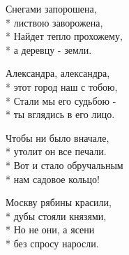 \medskip

\begin{minipage}{\linewidth}
Снегами запорошена,\\*
листвою заворожена,\\*
Найдет тепло прохожему,\\*
а деревцу - земли.\\
\end{minipage}\par\medskip\nobreak

\medskip

\begin{minipage}{\linewidth}
\hspace*{1.5em}Александра, александра,\\*
\hspace*{1.5em}этот город наш с тобою,\\*
\hspace*{1.5em}Стали мы его судьбою -\\*
\hspace*{1.5em}ты вглядись в его лицо.\\
\end{minipage}\par\medskip\nobreak

\medskip

\begin{minipage}{\linewidth}
\hspace*{1.5em}Чтобы ни было вначале,\\*
\hspace*{1.5em}утолит он все печали.\\*
\hspace*{1.5em}Вот и стало обручальным\\*
\hspace*{1.5em}нам садовое кольцо!\\
\end{minipage}\par\medskip\nobreak

\medskip

\begin{minipage}{\linewidth}
Москву рябины красили,\\*
дубы стояли князями,\\*
Но не они, а ясени\\*
без спросу наросли.\\
\end{minipage}\par\medskip\nobreak

\medskip

